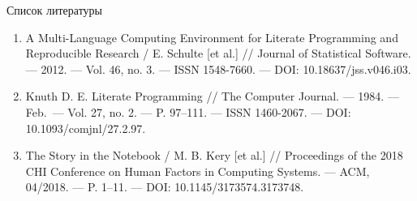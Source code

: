 \documentclass[
  ignorenonframetext,
  aspectratio=169,
]{beamer}
\begin{document}
\begin{frame}{Список литературы}
\label{ux441ux43fux438ux441ux43eux43a-ux43bux438ux442ux435ux440ux430ux442ux443ux440ux44b}
\begin{enumerate}[<+->]
\item
  A Multi-Language Computing Environment for Literate Programming and
  Reproducible Research / E. Schulte {[}et al.{]} // Journal of
  Statistical Software. --- 2012. --- Vol. 46, no. 3. --- ISSN
  1548-7660. --- DOI: 10.18637/jss.v046.i03.
\item
  Knuth D. E. Literate Programming // The Computer Journal. --- 1984.
  --- Feb.~--- Vol. 27, no. 2. --- P. 97--111. --- ISSN 1460-2067. ---
  DOI: 10.1093/comjnl/27.2.97.
\item
  The Story in the Notebook / M. B. Kery {[}et al.{]} // Proceedings of
  the 2018 CHI Conference on Human Factors in Computing Systems. ---
  ACM, 04/2018. --- P. 1--11. --- DOI: 10.1145/3173574.3173748.
\end{enumerate}
\end{frame}
\end{document}
